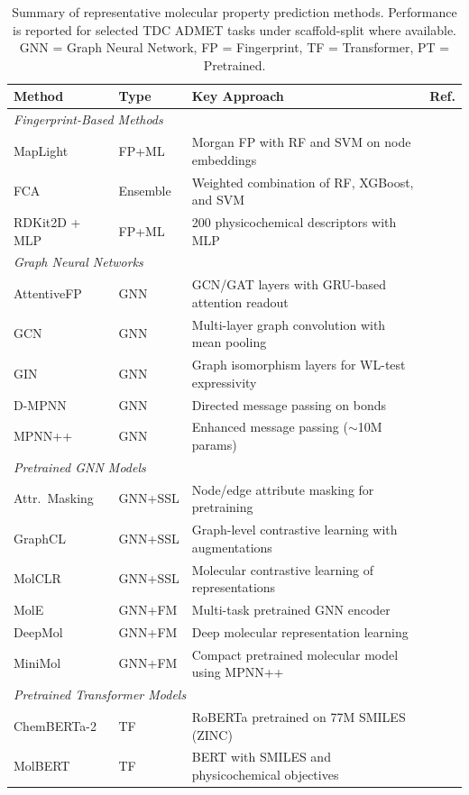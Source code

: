 \documentclass[journal]{IEEEtran}
\begin{document}
\begin{table}[!t]
\centering
\caption{Summary of representative molecular property prediction methods. Performance is reported for selected TDC ADMET tasks under scaffold-split where available. GNN = Graph Neural Network, FP = Fingerprint, TF = Transformer, PT = Pretrained.}
\label{tab:related_work_summary}
\scriptsize
\begin{tabular}{llp{5.5cm}l}
\toprule
\textbf{Method} & \textbf{Type} & \textbf{Key Approach} & \textbf{Ref.} \\
\midrule

\multicolumn{4}{l}{\emph{Fingerprint-Based Methods}} \\
\midrule
MapLight & FP+ML & Morgan FP with RF and SVM on node embeddings & \cite{maplight} \\
FCA & Ensemble & Weighted combination of RF, XGBoost, and SVM & \cite{cfa} \\
RDKit2D + MLP & FP+ML & 200 physicochemical descriptors with MLP & \cite{rdkit2d_mlp} \\

\midrule
\multicolumn{4}{l}{\emph{Graph Neural Networks}} \\
\midrule
AttentiveFP & GNN & GCN/GAT layers with GRU-based attention readout & \cite{attentiveFP} \\
GCN & GNN & Multi-layer graph convolution with mean pooling & \cite{kipf2017gcn} \\
GIN & GNN & Graph isomorphism layers for WL-test expressivity & \cite{xu2019gin} \\
D-MPNN & GNN & Directed message passing on bonds & \cite{yang2019dmpnn} \\
MPNN++ & GNN & Enhanced message passing ($\sim$10M params) & \cite{miniMol} \\

\midrule
\multicolumn{4}{l}{\emph{Pretrained GNN Models}} \\
\midrule
Attr.\ Masking & GNN+SSL & Node/edge attribute masking for pretraining & \cite{attrMasking} \\
GraphCL & GNN+SSL & Graph-level contrastive learning with augmentations & \cite{contrativeLearning} \\
MolCLR & GNN+SSL & Molecular contrastive learning of representations & \cite{molclr} \\
MolE & GNN+FM & Multi-task pretrained GNN encoder & \cite{molE} \\
DeepMol & GNN+FM & Deep molecular representation learning & \cite{deepMol} \\
MiniMol & GNN+FM & Compact pretrained molecular model using MPNN++ & \cite{miniMol} \\

\midrule
\multicolumn{4}{l}{\emph{Pretrained Transformer Models}} \\
\midrule
ChemBERTa-2 & TF & RoBERTa pretrained on 77M SMILES (ZINC) & \cite{chemberta2} \\
MolBERT & TF & BERT with SMILES and physicochemical objectives & \cite{molbert} \\

\bottomrule
\end{tabular}
\end{table}
\end{document}
